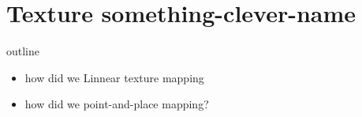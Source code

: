 \section{Texture something-clever-name}
outline
\begin{itemize}
	\item how did we Linnear texture mapping
	\item how did we point-and-place mapping?
\end{itemize}

